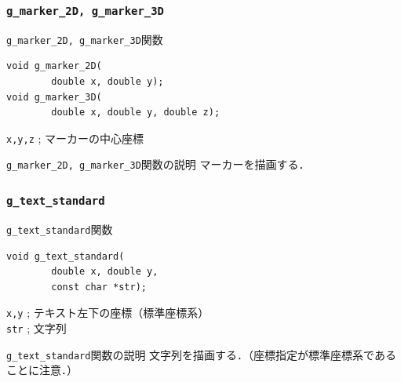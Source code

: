 \documentclass[platex,a4paper,12pt]{jsarticle}%
\begin{document}
\subsubsection{\texttt{g\_marker\_2D, g\_marker\_3D}}

\begin{itembox}[l]{\texttt{g\_marker\_2D, g\_marker\_3D}関数}
\begin{verbatim}
void g_marker_2D(
        double x, double y);
void g_marker_3D(
        double x, double y, double z);	
\end{verbatim}
\verb|x,y,z| ; マーカーの中心座標\\
\end{itembox}

\begin{itembox}[l]{\texttt{g\_marker\_2D, g\_marker\_3D}関数の説明}
マーカーを描画する．
\end{itembox}

\begin{figure}[htb]
\end{figure}



\clearpage
\subsubsection{\texttt{g\_text\_standard}}

\begin{itembox}[l]{\texttt{g\_text\_standard}関数}
\begin{verbatim}
void g_text_standard(
        double x, double y,
        const char *str);
\end{verbatim}
\verb|x,y| ; テキスト左下の座標（標準座標系）\\
\verb|str| ; 文字列\\
\end{itembox}

\begin{itembox}[l]{\texttt{g\_text\_standard}関数の説明}
文字列を描画する．（座標指定が標準座標系であることに注意．）
\end{itembox}
\end{document}
